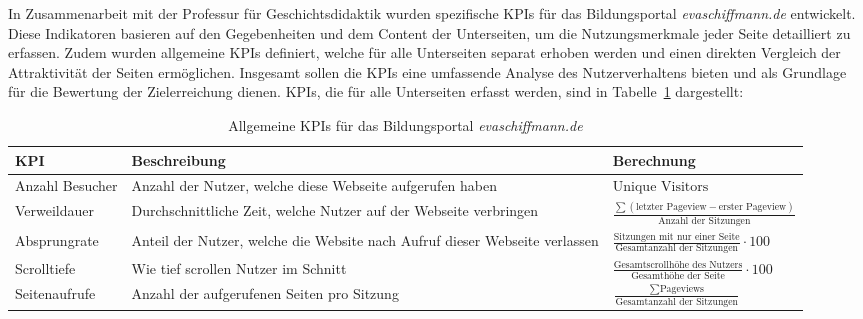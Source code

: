 In Zusammenarbeit mit der Professur für Geschichtsdidaktik wurden spezifische KPIs für das Bildungsportal \textit{evaschiffmann.de} entwickelt. Diese Indikatoren basieren auf den Gegebenheiten und dem Content der Unterseiten, um die Nutzungsmerkmale jeder Seite detailliert zu erfassen. Zudem wurden allgemeine KPIs definiert, welche für alle Unterseiten separat erhoben werden und einen direkten Vergleich der Attraktivität der Seiten ermöglichen. Insgesamt sollen die KPIs eine umfassende Analyse des Nutzerverhaltens bieten und als Grundlage für die Bewertung der Zielerreichung dienen. KPIs, die für alle Unterseiten erfasst werden, sind in Tabelle~\ref{tab:kpi_allgemein} dargestellt:

\begin{table}[h]
    \centering
    \caption{Allgemeine KPIs für das Bildungsportal \textit{evaschiffmann.de}}
    \label{tab:kpi_allgemein}
    \renewcommand{\arraystretch}{1.5} %
    \begin{tabularx}{\textwidth}{|X|X|X|}  
        \hline
        \textbf{KPI} & \textbf{Beschreibung} & \textbf{Berechnung} \\ \hline
        Anzahl Besucher & Anzahl der Nutzer, welche diese Webseite aufgerufen haben & {\footnotesize \(\text{Unique Visitors}\)} \\ \hline
        Verweildauer & Durchschnittliche Zeit, welche Nutzer auf der Webseite verbringen & 
        {\footnotesize \(\frac{\sum (\text{letzter Pageview} - \text{erster Pageview})}{\text{Anzahl der Sitzungen}}\)} \\ \hline
        Absprungrate & Anteil der Nutzer, welche die Website nach Aufruf dieser Webseite verlassen & 
        {\footnotesize \(\frac{\text{Sitzungen mit nur einer Seite}}{\text{Gesamtanzahl der Sitzungen}} \cdot 100\)} \\ \hline 
        Scrolltiefe & Wie tief scrollen Nutzer im Schnitt & 
        {\footnotesize \(\frac{\text{Gesamtscrollhöhe des Nutzers}}{\text{Gesamthöhe der Seite}} \cdot 100\)} \\ \hline
        Seitenaufrufe & Anzahl der aufgerufenen Seiten pro Sitzung & 
        {\footnotesize \(\frac{\sum \text{Pageviews}}{\text{Gesamtanzahl der Sitzungen}}\)} \\ \hline
    \end{tabularx}
\end{table}

